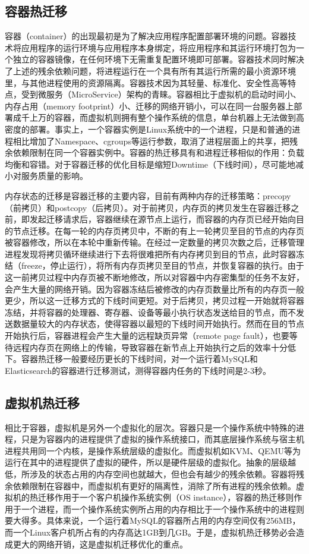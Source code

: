 \subsection{容器热迁移}
\label{chap:containermigration}
容器（container）\cite{container}的出现最初是为了解决应用程序配置部署环境的问题。容器技术将应用程序的运行环境与应用程序本身绑定，将应用程序和其运行环境打包为一个独立的容器镜像，在任何环境下无需重复配置环境即可部署。容器技术同时解决了上述的残余依赖问题，将进程运行在一个具有所有其运行所需的最小资源环境里，与其他进程使用的资源隔离。容器技术因为其轻量、标准化、安全性高等特点，受到微服务（MicroService）架构的青睐。容器相比于虚拟机的启动时间小、内存占用（memory footprint）小、迁移的网络开销小，可以在同一台服务器上部署成千上万的容器，而虚拟机则拥有整个操作系统的信息，单台机器上无法做到高密度的部署。事实上，一个容器实例是Linux系统中的一个进程，只是和普通的进程相比增加了Namespace、cgroups等运行参数，取消了进程层面上的共享，把残余依赖限制在同一个容器实例中。容器的热迁移\cite{Voyager}具有和进程迁移相似的作用：负载均衡和容错。对于容器迁移的优化目标是缩短Downtime（下线时间），尽可能地减小对服务质量的影响。

内存状态的迁移是容器迁移的主要内容，目前有两种内存的迁移策略：precopy（前拷贝）和postcopy（后拷贝）。对于前拷贝，内存页的拷贝发生在容器迁移之前，即发起迁移请求后，容器继续在源节点上运行，而容器的内存页已经开始向目的节点迁移。在每一轮的内存页拷贝中，不断的有上一轮拷贝至目的节点的内存页被容器修改，所以在本轮中重新传输。在经过一定数量的拷贝次数之后，迁移管理进程发现将拷贝循环继续进行下去将很难把所有内存拷贝到目的节点，此时容器冻结（freeze，停止运行），将所有内存页拷贝至目的节点，并恢复容器的执行。由于这一前拷贝过程中内存页被不断地修改，所以对容器中内存密集型的任务不友好，会产生大量的网络开销。因为容器冻结后被修改的内存页数量比所有的内存页一般更少，所以这一迁移方式的下线时间更短。对于后拷贝，拷贝过程一开始就将容器冻结，并将容器的处理器、寄存器、设备等最小执行状态发送给目的节点，而不发送数据量较大的内存状态，使得容器以最短的下线时间开始执行。然而在目的节点开始执行后，容器进程会产生大量的远程缺页异常（remote page fault），也要等待远程内存页在网络上的传输，导致容器在新节点上开始执行之后的效率十分低下。容器热迁移一般要经历更长的下线时间，对一个运行着MySQL和Elasticsearch的容器进行迁移测试，测得容器内任务的下线时间是2-3秒\cite{Voyager}。

\subsection{虚拟机热迁移}
相比于容器，虚拟机是另外一个虚拟化的层次。容器只是一个操作系统中特殊的进程，只是为容器内的进程提供了虚拟的操作系统接口，而其底层操作系统与宿主机进程共用同一个内核，是操作系统层级的虚拟化。而虚拟机如KVM、QEMU等为运行在其中的进程提供了虚拟的硬件，所以是硬件层级的虚拟化。抽象的层级越低，所涉及的状态占用的内存空间也就越大，但也会有越少的残余依赖。容器将残余依赖限制在容器中，而虚拟机有更好的隔离性，消除了所有进程的残余依赖。虚拟机的热迁移作用于一个客户机操作系统实例（OS instance），容器的热迁移则作用于一个进程，而一个操作系统实例所占用的内存相比于一个操作系统中的进程则要大得多。具体来说，一个运行着MySQL的容器所占用的内存空间仅有256MB\cite{Voyager}，而一个Linux客户机所占有的内存高达1GB到几GB。于是，虚拟机热迁移势必会造成更大的网络开销，这是虚拟机迁移优化的重点。

